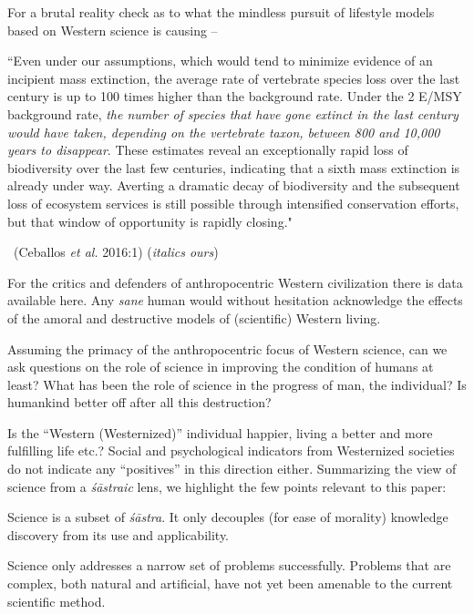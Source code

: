 For a brutal reality check as to what the mindless pursuit of lifestyle models based on Western science is causing –

\begin{myquote}
“Even under our assumptions, which would tend to minimize evidence of an incipient mass extinction, the average rate of vertebrate species loss over the last century is up to 100 times higher than the background rate. Under the 2 E/MSY background rate, \textit{the number of species that have gone extinct in the last century would have taken, depending on the vertebrate taxon, between 800 and 10,000 years to disappear}. These estimates reveal an exceptionally rapid loss of biodiversity over the last few centuries, indicating that a sixth mass extinction is already under way. Averting a dramatic decay of biodiversity and the subsequent loss of ecosystem services is still possible through intensified conservation efforts, but that window of opportunity is rapidly closing." 

~\hfill (Ceballos \textit{et al.} 2016:1) (\textit{italics ours})
\end{myquote}

For the critics and defenders of anthropocentric Western civilization there is data available here. Any \textit{sane} human would without hesitation acknowledge the effects of the amoral and destructive models of (scientific) Western living.

Assuming the primacy of the anthropocentric focus of Western science, can we ask questions on the role of science in improving the condition of humans at least? What has been the role of science in the progress of man, the individual? Is humankind better off after all this destruction?

Is the “Western (Westernized)” individual happier, living a better and more fulfilling life etc.? Social and psychological indicators from Westernized societies do not indicate any “positives” in this direction either. Summarizing the view of science from a \textit{śāstraic} lens, we highlight the few points relevant to this paper:

\item Science is a subset of \textit{śāstra}. It only decouples (for ease of morality) knowledge discovery from its use and applicability.

 \item Science only addresses a narrow set of problems successfully. Problems that are complex, both natural and artificial, have not yet been amenable to the current scientific method.

